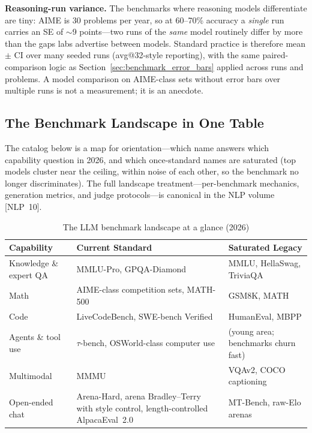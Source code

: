 \textbf{Reasoning-run variance.} The benchmarks where reasoning models differentiate are tiny: AIME is 30 problems per year, so at 60--70\% accuracy a \textit{single} run carries an SE of $\sim$9 points---two runs of the \textit{same} model routinely differ by more than the gaps labs advertise between models. Standard practice is therefore mean $\pm$ CI over many seeded runs (avg@32-style reporting), with the same paired-comparison logic as Section~\ref{sec:benchmark_error_bars} applied across runs and problems. A model comparison on AIME-class sets without error bars over multiple runs is not a measurement; it is an anecdote.

\subsection{The Benchmark Landscape in One Table}
\label{sec:benchmark_landscape}

The catalog below is a map for orientation---which name answers which capability question in 2026, and which once-standard names are saturated (top models cluster near the ceiling, within noise of each other, so the benchmark no longer discriminates). The full landscape treatment---per-benchmark mechanics, generation metrics, and judge protocols---is canonical in the NLP volume [NLP~10].

\begin{table}[H]
\centering
\caption{The LLM benchmark landscape at a glance (2026)}
\begin{tabularx}{\textwidth}{lXX}
\toprule
\textbf{Capability} & \textbf{Current Standard} & \textbf{Saturated Legacy} \\
\midrule
Knowledge \& expert QA & MMLU-Pro, GPQA-Diamond & MMLU, HellaSwag, TriviaQA \\
Math & AIME-class competition sets, MATH-500 & GSM8K, MATH \\
Code & LiveCodeBench, SWE-bench Verified & HumanEval, MBPP \\
Agents \& tool use & $\tau$-bench, OSWorld-class computer use & (young area; benchmarks churn fast) \\
Multimodal & MMMU & VQAv2, COCO captioning \\
Open-ended chat & Arena-Hard, arena Bradley--Terry with style control, length-controlled \mbox{AlpacaEval}~2.0 & MT-Bench, raw-Elo arenas \\
\bottomrule
\end{tabularx}
\end{table}

